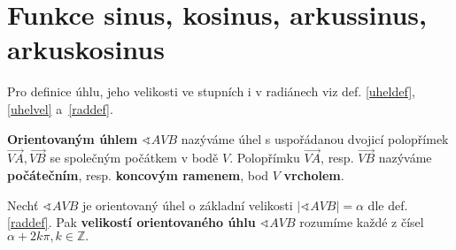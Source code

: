 \section{Funkce sinus, kosinus, arkussinus, arkuskosinus}

\begin{pozn}
  Pro definice úhlu, jeho velikosti ve stupních i v radiánech viz def. \ref{uheldef}, \ref{uhelvel} a~\ref{raddef}.
\end{pozn}

\begin{comment}
\begin{definition}
    Nechť $\sphericalangle AVB$ je úhel. Pak mu přiřazujeme číslo $a\in \mathbb R$,
    které nazýváme \textbf{velikostí úhlu} $\sphericalangle AVB$ takto:\\
    Nechť $k(V,r), X\in k\cap \overrightarrow{VA}, Y\in k\cap \overrightarrow{VB}.$
    Označme $s$ velikost oblouku $XY.$ Velikost úhlu pak definujeme jako
    $$\alpha = \frac{s}{r}.$$
\end{definition}

\begin{pozn}
    Je-li $s=r,$ má úhel $\alpha$ velikost 1 \textbf{radián}. Velikost úhlu lze vyjadřovat
    též ve stupních, přičemž platí $2\pi=360^\circ$.
\end{pozn}

\begin{veta}
    Nechť $\sphericalangle AVB$ je úhel, $\alpha$ jeho velikost v radiánech a $\beta$
    jeho velikost ve stupních. Pak platí:
    \begin{align*}
        \alpha = \beta\cdot \frac{\pi}{180^\circ}, & & \beta = \alpha\cdot \frac{180^\circ}{\pi}.
    \end{align*}
\end{veta}

PRESUNUTO DO PLANIMETRIE
\end{comment}

\begin{definition}
    \textbf{Orientovaným úhlem} $\sphericalangle AVB$ nazýváme úhel s uspořádanou dvojicí
    polopřímek $\overrightarrow{VA}, \overrightarrow{VB}$ se společným počátkem v bodě $V.$
    Polopřímku $\overrightarrow{VA}$, resp. $\overrightarrow{VB}$ nazýváme \textbf{počátečním},
    resp. \textbf{koncovým ramenem}, bod $V$ \textbf{vrcholem}.
\end{definition}

\begin{definition}
    Nechť $\sphericalangle AVB$ je orientovaný úhel o základní velikosti $|\sphericalangle AVB| = \alpha$ dle def. \ref{raddef}. Pak
    \textbf{velikostí orientovaného úhlu} $\sphericalangle AVB$ rozumíme každé z
    čísel $\alpha +2k\pi, k \in \mathbb Z.$
\end{definition}

